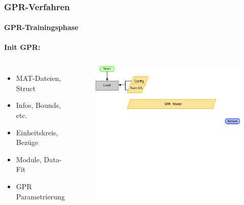 \documentclass{beamer}
\begin{document}
\begin{frame}
\frametitle{GPR-Verfahren}
\framesubtitle{GPR-Trainingsphase}
\textbf{Init GPR:}
\begin{columns}[c]
	\begin{itemize}
		\item<1-> MAT-Dateien, Struct
		\item<2-> Infos, Bounds, etc.
		\item<3-> Einheitskreis, Bezüge
		\item<4-> Module, Data-Fit
		\item<5-> GPR Parametrierung
	\end{itemize}
	\begin{figure}
		\begin{overprint}
			\includegraphics[width=\linewidth]{images/GPR_Initialization-1}

\end{overprint}
\end{figure}
\end{columns}
\end{frame}
\end{document}
